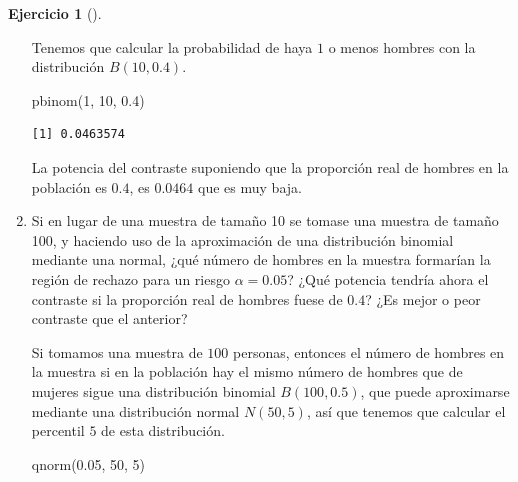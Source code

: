 \documentclass[
  a4paper,
]{scrreport}
\newenvironment{Shaded}{\begin{snugshade}}{\end{snugshade}}
\newcommand{\DecValTok}[1]{\textcolor[rgb]{0.68,0.00,0.00}{#1}}
\newcommand{\FloatTok}[1]{\textcolor[rgb]{0.68,0.00,0.00}{#1}}
\newcommand{\FunctionTok}[1]{\textcolor[rgb]{0.28,0.35,0.67}{#1}}
\newcommand{\NormalTok}[1]{\textcolor[rgb]{0.00,0.23,0.31}{#1}}
\theoremstyle{definition}
\newtheorem{exercise}{Ejercicio}[chapter]
\theoremstyle{remark}
\begin{document}
\begin{exercise}[]
\begin{enumerate}
\begin{tcolorbox}
  Tenemos que calcular la probabilidad de haya \(1\) o menos hombres con
  la distribución \(B(10, 0.4)\).

\begin{Shaded}
\begin{Highlighting}[]
\FunctionTok{pbinom}\NormalTok{(}\DecValTok{1}\NormalTok{, }\DecValTok{10}\NormalTok{, }\FloatTok{0.4}\NormalTok{)}
\end{Highlighting}
\end{Shaded}

\begin{verbatim}
[1] 0.0463574
\end{verbatim}

  La potencia del contraste suponiendo que la proporción real de hombres
  en la población es \(0.4\), es \(0.0464\) que es muy baja.

  \end{tcolorbox}
\item
  Si en lugar de una muestra de tamaño 10 se tomase una muestra de
  tamaño 100, y haciendo uso de la aproximación de una distribución
  binomial mediante una normal, ¿qué número de hombres en la muestra
  formarían la región de rechazo para un riesgo \(\alpha=0.05\)? ¿Qué
  potencia tendría ahora el contraste si la proporción real de hombres
  fuese de \(0.4\)? ¿Es mejor o peor contraste que el anterior?

  \begin{tcolorbox}[enhanced jigsaw, coltitle=black, left=2mm, colback=white, leftrule=.75mm, toptitle=1mm, breakable, bottomrule=.15mm, titlerule=0mm, bottomtitle=1mm, title=\textcolor{quarto-callout-tip-color}{\faLightbulb}\hspace{0.5em}{Solución}, arc=.35mm, toprule=.15mm, rightrule=.15mm, colframe=quarto-callout-tip-color-frame, opacityback=0, colbacktitle=quarto-callout-tip-color!10!white, opacitybacktitle=0.6]

  Si tomamos una muestra de \(100\) personas, entonces el número de
  hombres en la muestra si en la población hay el mismo número de
  hombres que de mujeres sigue una distribución binomial \(B(100,0.5)\),
  que puede aproximarse mediante una distribución normal \(N(50,5)\),
  así que tenemos que calcular el percentil \(5\) de esta distribución.

\begin{Shaded}
\begin{Highlighting}[]
\FunctionTok{qnorm}\NormalTok{(}\FloatTok{0.05}\NormalTok{, }\DecValTok{50}\NormalTok{, }\DecValTok{5}\NormalTok{)}
\end{Highlighting}
\end{Shaded}


\end{tcolorbox}
\end{enumerate}
\end{exercise}
\end{document}
